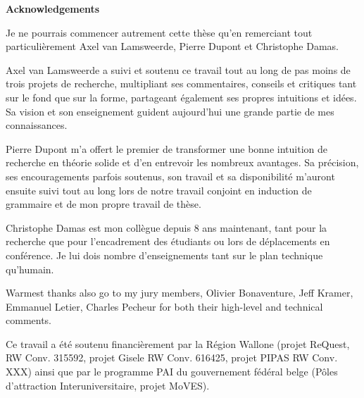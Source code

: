 \begin{center}
\textbf{\large Acknowledgements}
\end{center}

Je ne pourrais commencer autrement cette th\`ese qu'en remerciant tout 
particuli\`erement Axel van Lamsweerde, Pierre Dupont et Christophe Damas.

Axel van Lamsweerde a suivi et soutenu ce travail tout au long de pas moins de 
trois projets de recherche, multipliant ses commentaires, conseils et critiques 
tant sur le fond que sur la forme, partageant \'egalement ses propres intuitions 
et id\'ees. Sa vision et son enseignement guident aujourd'hui une grande partie 
de mes connaissances.

Pierre Dupont m'a offert le premier de transformer une bonne intuition de 
recherche en th\'eorie solide et d'en entrevoir les nombreux avantages. Sa 
pr\'ecision, ses encouragements parfois soutenus, son travail et sa 
disponibilit\'e m'auront ensuite suivi tout au long lors de notre travail 
conjoint en induction de grammaire et de mon propre travail de th\`ese.

Christophe Damas est mon coll\`egue depuis 8 ans maintenant, tant pour la 
recherche que pour l'encadrement des \'etudiants ou lors de d\'eplacements en 
conf\'erence. Je lui dois nombre d'enseignements tant sur le plan technique 
qu'humain.

Warmest thanks also go to my jury members, Olivier Bonaventure, Jeff Kramer, 
Emmanuel Letier, Charles Pecheur for both their high-level and technical 
comments.

Ce travail a \'et\'e soutenu financi\`erement par la R\'egion Wallone (projet 
ReQuest, RW Conv. 315592, projet Gisele RW Conv. 616425, projet PIPAS RW Conv. 
XXX) ainsi que par le programme PAI du gouvernement f\'ed\'eral belge (P\^oles 
d'attraction Interuniversitaire, projet MoVES).

